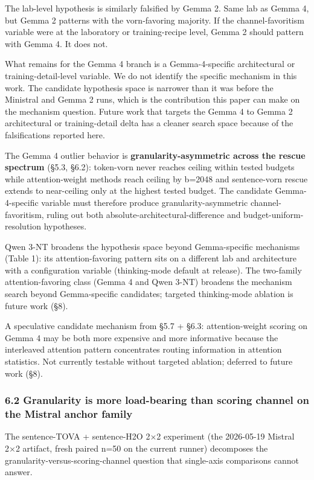 \documentclass[
]{article}
\begin{document}
The lab-level hypothesis is similarly falsified by Gemma 2. Same lab
as Gemma 4, but Gemma 2 patterns with the vorn-favoring
majority. If the channel-favoritism variable were at the laboratory or
training-recipe level, Gemma 2 should pattern with Gemma 4. It does not.

What remains for the Gemma 4 branch is a Gemma-4-specific
architectural or training-detail-level variable. We do not identify the specific
mechanism in this work. The candidate hypothesis space is narrower than
it was before the Ministral and Gemma 2 runs, which is the contribution
this paper can make on the mechanism question. Future work that targets
the Gemma 4 to Gemma 2 architectural or training-detail delta has a
cleaner search space because of the falsifications reported here.

The Gemma 4 outlier behavior is \textbf{granularity-asymmetric across
the rescue spectrum} (§5.3, §6.2): token-vorn never reaches ceiling
within tested budgets while attention-weight methods reach ceiling by
b=2048 and sentence-vorn rescue extends to near-ceiling only at the
highest tested budget. The candidate Gemma-4-specific variable must
therefore produce granularity-asymmetric channel-favoritism, ruling
out both absolute-architectural-difference and budget-uniform-
resolution hypotheses.

Qwen 3-NT broadens the hypothesis space beyond Gemma-specific
mechanisms (Table 1): its attention-favoring pattern sits on a
different lab and architecture with a configuration variable
(thinking-mode default at release). The two-family attention-favoring
class (Gemma 4 and Qwen 3-NT) broadens the mechanism search beyond
Gemma-specific candidates; targeted thinking-mode ablation is future
work (§8).

A speculative candidate mechanism from §5.7 + §6.3: attention-weight
scoring on Gemma 4 may be both more expensive and more informative
because the interleaved attention pattern concentrates routing
information in attention statistics. Not currently testable without
targeted ablation; deferred to future work (§8).

\subsubsection{6.2 Granularity is more load-bearing than scoring channel
on the Mistral anchor
family}\label{62-granularity-is-more-load-bearing-than-scoring-channel-on-the-mistral-anchor-family}

The sentence-TOVA + sentence-H2O 2×2 experiment (the
2026-05-19 Mistral 2×2 artifact, fresh paired n=50 on the current
runner) decomposes the granularity-versus-scoring-channel question that
single-axis comparisons cannot answer.
\end{document}
